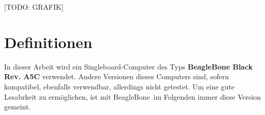 [TODO: GRAFIK]


\section{Definitionen}
In dieser Arbeit wird ein Singleboard-Computer des Typs \textbf{BeagleBone Black Rev. A5C} verwendet. Andere Versionen dieses Computers sind, sofern kompatibel, ebenfalls verwendbar, allerdings nicht getestet. Um eine gute Lesabrkeit zu ermöglichen, ist mit \glqq BeagleBone\grqq ~im Folgenden immer diese Version gemeint.